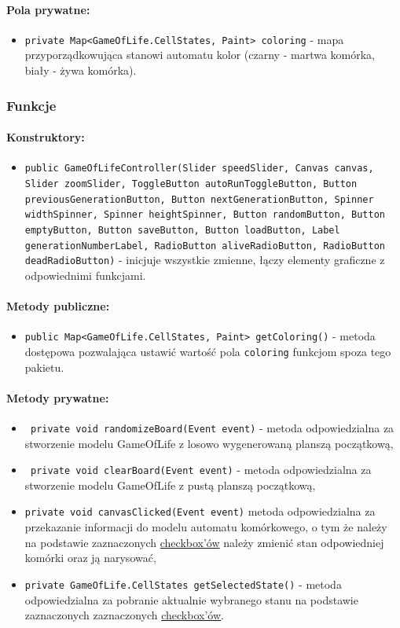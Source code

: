 \documentclass{report}
\begin{document}
\paragraph{Pola prywatne:}
\begin{itemize}
	\item \texttt{private Map<GameOfLife.CellStates, Paint> coloring} - mapa przyporządkowująca stanowi automatu kolor (czarny - martwa komórka, biały - żywa komórka).
\end{itemize}
\subsubsection{Funkcje}
\paragraph{Konstruktory:}
\begin{itemize}
\item \texttt{public GameOfLifeController(Slider speedSlider, Canvas canvas, Slider zoomSlider, ToggleButton autoRunToggleButton, Button previousGenerationButton, Button nextGenerationButton, Spinner widthSpinner, Spinner heightSpinner, Button randomButton, Button emptyButton, Button saveButton, Button loadButton, Label generationNumberLabel, RadioButton aliveRadioButton, RadioButton deadRadioButton)} - inicjuje wszystkie zmienne, łączy elementy graficzne z odpowiednimi funkcjami.
\end{itemize}
\paragraph{Metody publiczne:}
\begin{itemize}
 	\item \texttt{public Map<GameOfLife.CellStates, Paint> getColoring()} - metoda dostępowa pozwalająca ustawić wartość pola \texttt{coloring} funkcjom spoza tego pakietu.
\end{itemize}
\paragraph{Metody prywatne:}
\begin{itemize}
 	\item \texttt{ private void randomizeBoard(Event event)} - metoda odpowiedzialna za stworzenie modelu GameOfLife z losowo wygenerowaną planszą początkową,
 	\item \texttt{ private void clearBoard(Event event)} - metoda odpowiedzialna za stworzenie modelu GameOfLife z pustą planszą początkową,
 	\item \texttt{private void canvasClicked(Event event)} metoda odpowiedzialna za przekazanie informacji do modelu automatu komórkowego, o tym że należy na podstawie zaznaczonych \hyperref[sec:checkbox]{checkbox'ów} należy zmienić stan odpowiedniej komórki oraz ją narysować,
 	\item \texttt{private GameOfLife.CellStates getSelectedState()} - metoda odpowiedzialna za pobranie aktualnie wybranego stanu na podstawie zaznaczonych  zaznaczonych \hyperref[sec:checkbox]{checkbox'ów}.
\end{itemize}
\end{document}
